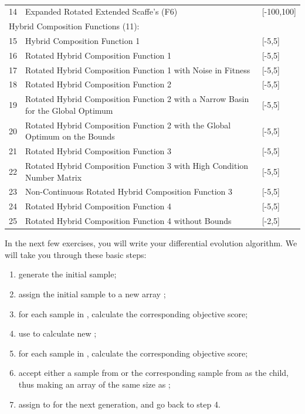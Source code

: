 \begin{table}[t]
\begin{tabular}{lp{9cm}l}
14  &Expanded Rotated Extended Scaffe's  (F6) 				                 & [-100,100]\\
\multicolumn{3}{l}{Hybrid Composition Functions (11):}\\
15  &Hybrid Composition Function 1				                         & [-5,5]\\
16  &Rotated Hybrid Composition Function 1				                 & [-5,5]\\
17  &Rotated Hybrid Composition Function 1 with Noise in Fitness	                 & [-5,5]\\
18  &Rotated Hybrid Composition Function 2			        	         & [-5,5]\\
19  &Rotated Hybrid Composition Function 2 with a Narrow Basin for the Global Optimum    & [-5,5]\\
20  &Rotated Hybrid Composition Function 2 with the Global Optimum on the Bounds         & [-5,5]\\
21  &Rotated Hybrid Composition Function 3				 	         & [-5,5]\\
22  &Rotated Hybrid Composition Function 3 with High Condition Number Matrix	 	 & [-5,5]\\
23  &Non-Continuous Rotated Hybrid Composition Function 3		                 & [-5,5]\\
24  &Rotated Hybrid Composition Function 4				                 & [-5,5]\\
25  &Rotated Hybrid Composition Function 4 without Bounds	                         & [-2,5]\\
\end{tabular}
\caption{}
\label{tab:benchmark-func-data}
\end{table}




In the next few exercises, you will write your differential evolution algorithm. We will take you through these basic steps:
\begin{enumerate}
\item{generate the initial sample;}
\item{assign the initial sample to a new array ;}
\item{for each sample in , calculate the corresponding objective score;}
\item{use  to calculate new ;}
\item{for each sample in , calculate the corresponding objective score;}
\item{accept either a sample from  or the corresponding sample from  as the child, thus making an array  of the same size as ;}
\item{assign  to  for the next generation, and go back to step 4.}
\end{enumerate}

